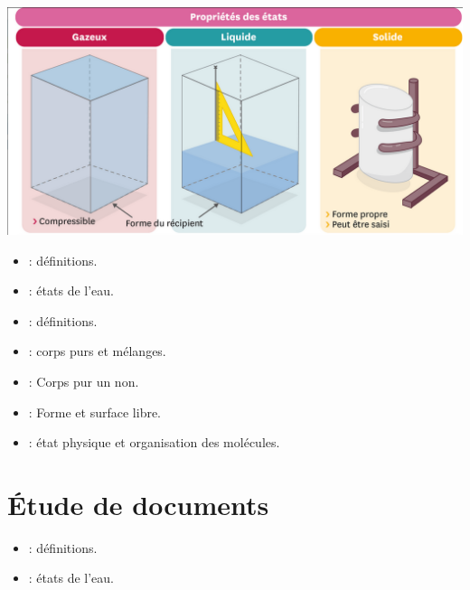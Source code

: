 \documentclass[12pt,a4paper]{article}
\begin{document}
\begin{center}
	\includegraphics[scale=0.5]{etats}
\end{center}
\begin{myexos}
	\begin{itemize}
		\item {} : définitions.
		\item {} : états de l'eau.
		\item {} : définitions.
		\item {} : corps purs et mélanges.
		\item {} : Corps pur un non.
		\item {} : Forme et surface libre.
		\item {} : état physique et organisation des molécules.
	\end{itemize}
\end{myexos}

\section{Étude de documents}


\begin{myexos}
	\begin{itemize}
		\item {} : définitions.
		\item {} : états de l'eau.
		
	\end{itemize}
\end{myexos}

\appendix

\end{document}
